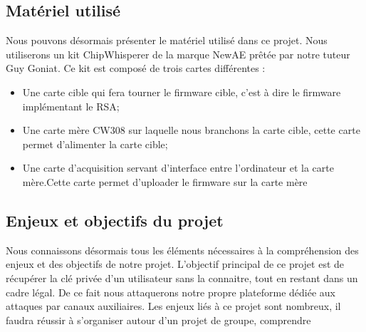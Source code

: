 \subsection{Matériel utilisé}
Nous pouvons désormais présenter le matériel utilisé dans ce projet. Nous utiliserons un kit ChipWhisperer de la marque NewAE prêtée par notre tuteur Guy Goniat. Ce kit est composé de trois cartes différentes :
\begin{itemize}
\item Une carte cible qui fera tourner le firmware cible, c'est à dire le firmware implémentant le RSA;
\item Une carte mère CW308 sur laquelle nous branchons la carte cible, cette carte permet d'alimenter la carte cible;
\item Une carte d’acquisition servant d'interface entre l'ordinateur et la carte mère.Cette carte permet d'uploader le firmware sur la carte mère

\end{itemize}

\subsection{Enjeux et objectifs du projet}
Nous connaissons désormais tous les éléments nécessaires à la compréhension des enjeux et des objectifs de notre projet. L'objectif principal de ce projet est de récupérer la clé privée d'un utilisateur sans la connaitre, tout en restant dans un cadre légal. De ce fait nous attaquerons notre propre plateforme dédiée aux attaques par canaux auxiliaires. Les enjeux liés à ce projet sont nombreux, il faudra réussir à s’organiser autour d'un projet de groupe, comprendre

